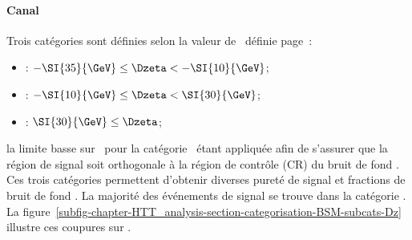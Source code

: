 \paragraph{Canal \ele\mu}
Trois catégories sont définies selon la valeur de \Dzeta\ définie page~\pageref{eq-Dzeta_def}:
\begin{itemize}
\item \CATlowdz: $-\SI{35}{\GeV} \leq \Dzeta < -\SI{10}{\GeV}$;
\item \CATmediumdz: $-\SI{10}{\GeV} \leq \Dzeta < \SI{30}{\GeV}$;
\item \CAThighdz: $\SI{30}{\GeV} \leq \Dzeta$;
\end{itemize}
la limite basse sur \Dzeta\ pour la catégorie \CATlowdz\ étant appliquée afin de s'assurer que la région de signal soit orthogonale à la région de contrôle (CR) du bruit de fond \ttbar.
Ces trois catégories permettent d'obtenir diverses pureté de signal et fractions de bruit de fond \ttbar.
La majorité des événements de signal se trouve dans la catégorie \CATmediumdz.
La figure~\ref{subfig-chapter-HTT_analysis-section-categorisation-BSM-subcats-Dz} illustre ces coupures sur \Dzeta.
